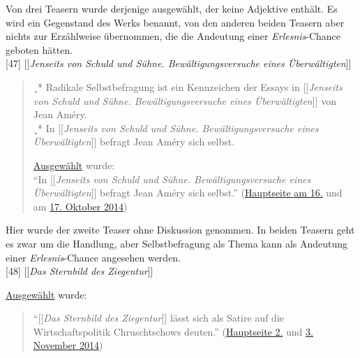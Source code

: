 \documentclass[fontsize=12pt]{scrartcl}
\begin{document}
Von drei Teasern wurde derjenige ausgew\"ahlt, der keine Adjektive enth\"alt. Es wird ein Gegenstand des Werks benannt, von den anderen beiden Teasern aber nichts zur Erz\"ahlweise \"ubernommen, die die Andeutung einer \textit{Erlesnis}-Chance geboten h\"atten.\\ 

[47] [[\textit{Jenseits von Schuld und S\"uhne. Bew\"altigungsversuche eines \"Uberw\"altigten}]]
\singlespacing
\begin{quote}
¸* Radikale Selbstbefragung ist ein Kennzeichen der Essays in [[\textit{Jenseits von Schuld und S\"uhne. Bew\"altigungsversuche eines \"Uber\-w\"al\-tig\-ten}]] von Jean Am\'{e}ry.\\
¸* In [[\textit{Jenseits von Schuld und S\"uhne. Bew\"altigungsversuche eines \"Uber\-w\"al\-tig\-ten}]] befragt Jean Am\'{e}ry sich selbst.

\href{https://de.wikipedia.org/wiki/Wikipedia_Diskussion:Hauptseite/Schon_gewusst/Diskussionsarchiv/2014/Oktober#Vorschlag:_Jenseits_von_Schuld_und_S.C3.BChne_.2810._September.29_.28erl..29}{Ausgew\"ahlt} wurde:\\
"`In [[\textit{Jenseits von Schuld und S\"uhne. Bew\"altigungsversuche eines \"Uber\-w\"al\-tig\-ten}]] befragt Jean Am\'{e}ry sich selbst."' (\href{https://de.wikipedia.org/wiki/Wikipedia:Hauptseite/Archiv/16._Oktober_2014}{Hauptseite am 16.} und am \href{https://de.wikipedia.org/wiki/Wikipedia:Hauptseite/Archiv/17._Oktober_2014}{17. Oktober 2014})
\end{quote}
\onehalfspacing

Hier wurde der zweite Teaser ohne Dis\-kus\-si\-on genommen. In beiden Teasern geht es zwar um die Handlung, aber Selbstbefragung als Thema kann als Andeutung einer \textit{Erlesnis}-Chance angesehen werden.\\

[48] [[\textit{Das Sternbild des Ziegentur}]]

\href{https://de.wikipedia.org/wiki/Wikipedia_Diskussion:Hauptseite/Schon_gewusst/Diskussionsarchiv/2014/Oktober#Vorschlag:_Das_Sternbild_des_Ziegentur_.2814._Oktober.29_.28erl..29}{Ausgew\"ahlt} wurde:
\singlespacing
\begin{quote}
"`[[\textit{Das Sternbild des Ziegentur}]] l\"asst sich als Satire auf die Wirt\-schafts\-po\-li\-tik Chruschtschows deuten."' (\href{https://de.wikipedia.org/wiki/Wikipedia:Hauptseite/Archiv/2._November_2014}{Hauptseite 2.} und \href{https://de.wikipedia.org/wiki/Wikipedia:Hauptseite/Archiv/3._November_2014}{3. November 2014})
\end{quote}
\onehalfspacing
\end{document}
